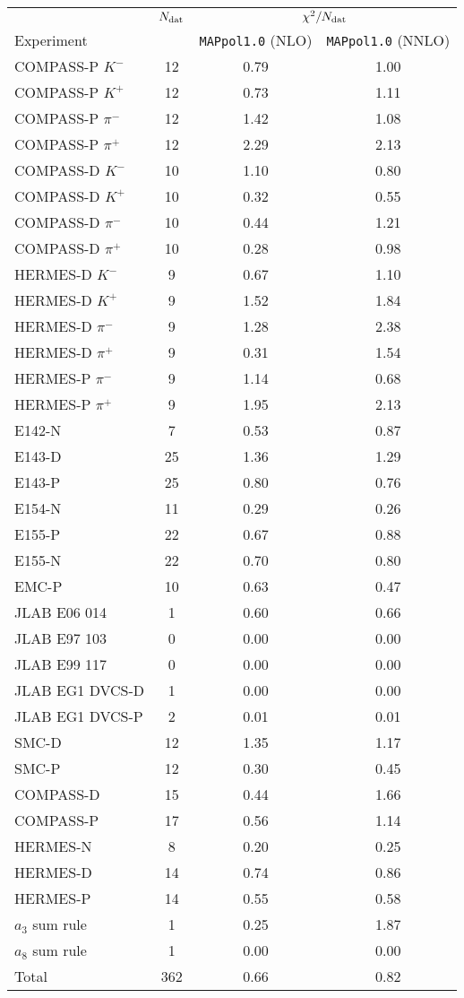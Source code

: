 \begin{tabular}{l@{\hspace{1cm}}c@{\hspace{1cm}}c@{\hspace{1cm}}c}
  \toprule \midrule
  \addlinespace
                        &  $N_{\textrm{dat}}$  & \multicolumn{2}{c}{$\chi^2/N_{\textrm{dat}}$} \\
  \cmidrule(lr){3-4}
      Experiment        &           &   \texttt{MAPpol1.0} (NLO)   &  \texttt{MAPpol1.0} (NNLO)  \tabularnewline
  \midrule
  \addlinespace
      COMPASS-P $K^-$  &  12 &   0.79   &   1.00   \tabularnewline
      COMPASS-P $K^+$  &  12 &   0.73   &   1.11   \tabularnewline
    COMPASS-P $\pi^-$  &  12 &   1.42   &   1.08   \tabularnewline
    COMPASS-P $\pi^+$  &  12 &   2.29   &   2.13   \tabularnewline
      COMPASS-D $K^-$  &  10 &   1.10   &   0.80   \tabularnewline
      COMPASS-D $K^+$  &  10 &   0.32   &   0.55   \tabularnewline
    COMPASS-D $\pi^-$  &  10 &   0.44   &   1.21   \tabularnewline
    COMPASS-D $\pi^+$  &  10 &   0.28   &   0.98   \tabularnewline
      HERMES-D  $K^-$  &   9 &   0.67   &   1.10   \tabularnewline
      HERMES-D  $K^+$  &   9 &   1.52   &   1.84   \tabularnewline
    HERMES-D  $\pi^-$  &   9 &   1.28   &   2.38   \tabularnewline
    HERMES-D  $\pi^+$  &   9 &   0.31   &   1.54   \tabularnewline
    HERMES-P  $\pi^-$  &   9 &   1.14   &   0.68   \tabularnewline
    HERMES-P  $\pi^+$  &   9 &   1.95   &   2.13   \tabularnewline
               E142-N  &   7 &   0.53   &   0.87   \tabularnewline
               E143-D  &  25 &   1.36   &   1.29   \tabularnewline
               E143-P  &  25 &   0.80   &   0.76   \tabularnewline
               E154-N  &  11 &   0.29   &   0.26   \tabularnewline
               E155-P  &  22 &   0.67   &   0.88   \tabularnewline
               E155-N  &  22 &   0.70   &   0.80   \tabularnewline
                EMC-P  &  10 &   0.63   &   0.47   \tabularnewline
         JLAB E06 014  &   1 &   0.60   &   0.66   \tabularnewline
         JLAB E97 103  &   0 &   0.00   &   0.00   \tabularnewline
         JLAB E99 117  &   0 &   0.00   &   0.00   \tabularnewline
      JLAB EG1 DVCS-D  &   1 &   0.00   &   0.00   \tabularnewline
      JLAB EG1 DVCS-P  &   2 &   0.01   &   0.01   \tabularnewline
                SMC-D  &  12 &   1.35   &   1.17   \tabularnewline
                SMC-P  &  12 &   0.30   &   0.45   \tabularnewline
            COMPASS-D  &  15 &   0.44   &   1.66   \tabularnewline    
            COMPASS-P  &  17 &   0.56   &   1.14   \tabularnewline
             HERMES-N  &   8 &   0.20   &   0.25   \tabularnewline
             HERMES-D  &  14 &   0.74   &   0.86   \tabularnewline
             HERMES-P  &  14 &   0.55   &   0.58   \tabularnewline
       $a_3$ sum rule  &   1 &   0.25   &   1.87   \tabularnewline
       $a_8$ sum rule  &   1 &   0.00   &   0.00   \tabularnewline
  \midrule
  \addlinespace
                Total  & 362 &   0.66   &   0.82   \tabularnewline
  \midrule \bottomrule
\end{tabular}